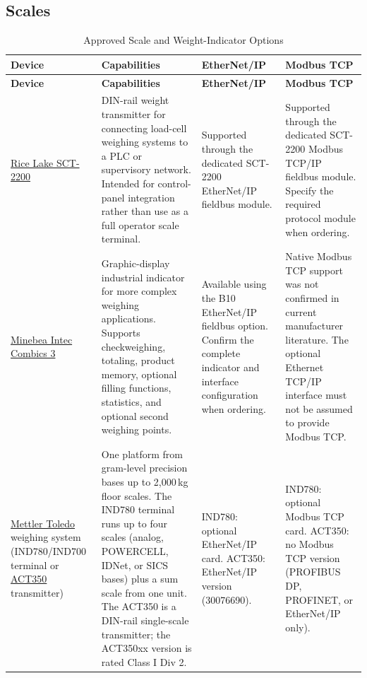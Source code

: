 \subsection{Scales}
\begin{longtable}{@{}P{3.23cm}P{5.71cm}P{3.77cm}P{3.77cm}@{}}
\caption{Approved Scale and Weight-Indicator Options}\label{tab:scales} \\
\toprule
{}\textbf{Device} & \textbf{Capabilities} & \textbf{EtherNet/IP} & \textbf{Modbus TCP} \\
\midrule
\endfirsthead
\toprule
{}\textbf{Device} & \textbf{Capabilities} & \textbf{EtherNet/IP} & \textbf{Modbus TCP} \\
\midrule
\endhead
\href{https://www.ricelake.com/resources/catalogs/sct-2200-catalog-page}{Rice Lake SCT-2200} & DIN-rail weight transmitter for connecting load-cell weighing systems to a PLC or supervisory network. Intended for control-panel integration rather than use as a full operator scale terminal. & Supported through the dedicated SCT-2200 EtherNet/IP fieldbus module. & Supported through the dedicated SCT-2200 Modbus TCP/IP fieldbus module. Specify the required protocol module when ordering. \\
\href{https://www.minebea-intec.com/en/industrial-scales/weight-indicators/weight-indicator-combics}{Minebea Intec Combics 3} & Graphic-display industrial indicator for more complex weighing applications. Supports checkweighing, totaling, product memory, optional filling functions, statistics, and optional second weighing points. & Available using the B10 EtherNet/IP fieldbus option. Confirm the complete indicator and interface configuration when ordering. & Native Modbus TCP support was not confirmed in current manufacturer literature. The optional Ethernet TCP/IP interface must not be assumed to provide Modbus TCP. \\
\href{https://www.mt.com/us/en/home/products/Industrial_Weighing_Solutions/scale-indicator/ind700.html}{Mettler Toledo} weighing system (IND780/IND700 terminal or \href{https://www.mt.com/dam/product_organizations/industry/Load_Cells/Downloads/Transmitter/ACT350/act350analog/datssheets/30246738_C_MAR_DS_ACT350_ACT350xx_Analog_EN.pdf}{ACT350} transmitter) & One platform from gram-level precision bases up to 2,000\,kg floor scales. The IND780 terminal runs up to four scales (analog, POWERCELL, IDNet, or SICS bases) plus a sum scale from one unit. The ACT350 is a DIN-rail single-scale transmitter; the ACT350xx version is rated Class I Div 2. & IND780: optional EtherNet/IP card. ACT350: EtherNet/IP version (30076690). & IND780: optional Modbus TCP card. ACT350: no Modbus TCP version (PROFIBUS DP, PROFINET, or EtherNet/IP only). \\
\bottomrule
\end{longtable}
